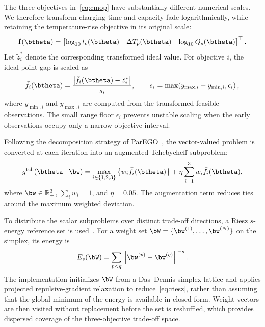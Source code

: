 The three objectives in~\eqref{eq:cmop} have substantially different numerical
scales. We therefore transform charging time and capacity fade logarithmically,
while retaining the temperature-rise objective in its original scale:
\begin{equation}
\tilde{\mathbf f}(\btheta)=
\begin{bmatrix}
\log_{10} t_c(\btheta) &
\Delta T_p(\btheta) &
\log_{10} Q_s(\btheta)
\end{bmatrix}^{\top}.
\label{eq:log}
\end{equation}
Let $\tilde z_i^{\ast}$ denote the corresponding transformed ideal value. For
objective $i$, the ideal-point gap is scaled as
\begin{equation}
\bar f_i(\btheta)=
\frac{\left|\tilde f_i(\btheta)-\tilde z_i^{\ast}\right|}{s_i},
\qquad
s_i=\max\!\left(y_{\max,i}-y_{\min,i},\epsilon_i\right),
\label{eq:norm}
\end{equation}
where $y_{\min,i}$ and $y_{\max,i}$ are computed from the transformed feasible
observations. The small range floor $\epsilon_i$ prevents unstable scaling when
the early observations occupy only a narrow objective interval.

Following the decomposition strategy of ParEGO~\cite{ref4}, the vector-valued
problem is converted at each iteration into an augmented Tchebycheff
subproblem:
\begin{equation}
g^{\mathrm{tch}}(\btheta\mid\bw)
=
\max_{i\in\{1,2,3\}}
\left\{w_i\bar f_i(\btheta)\right\}
+\eta\sum_{i=1}^{3} w_i\bar f_i(\btheta),
\label{eq:tch}
\end{equation}
where $\bw\in\mathbb{R}_{+}^{3}$, $\sum_i w_i=1$, and $\eta=0.05$. The
augmentation term reduces ties around the maximum weighted deviation.

To distribute the scalar subproblems over distinct trade-off directions, a
Riesz $s$-energy reference set is used~\cite{ref15}. For a weight set
$\bW=\{\bw^{(1)},\ldots,\bw^{(N)}\}$ on the simplex, its energy is
\begin{equation}
E_s(\bW)=\sum_{p<q}
\left\|\bw^{(p)}-\bw^{(q)}\right\|^{-s}.
\label{eq:riesz}
\end{equation}
The implementation initializes $\bW$ from a Das--Dennis simplex lattice and
applies projected repulsive-gradient relaxation to reduce~\eqref{eq:riesz},
rather than assuming that the global minimum of the energy is available in
closed form. Weight vectors are then visited without replacement before the set
is reshuffled, which provides dispersed coverage of the three-objective
trade-off space.

